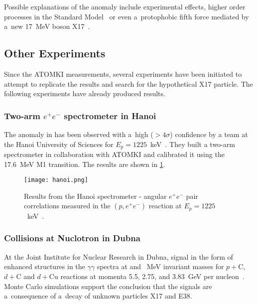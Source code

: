 				Possible explanations of the anomaly include experimental effects, higher order processes in the Standard Model~\cite{kalman,aleksejevs} or even a~protophobic fifth force mediated by a~new 17~MeV boson X17~\cite{feng}.
		\subsection{Other Experiments}
			Since the ATOMKI measurements, several experiments have been initiated to attempt to replicate the results and search for the hypothetical X17 particle. The following experiments have already produced results.
			
			\subsubsection{Two-arm $e^+e^-$ spectrometer in Hanoi}
				The anomaly in  has been observed with a~high ($>4\sigma$) confidence by a team at the Hanoi University of Sciences for $E_p = 1225$~keV~\cite{hanoi}. They built a two\nobreakdash-arm spectrometer in collaboration with ATOMKI and calibrated it using the 17.6~MeV M1 transition. The results are shown in \cref{fig:hanoi}.
				
				\begin{figure}
					\centering
					\texttt{[image: hanoi.png]}
					\caption{Results from the Hanoi spectrometer - angular $e^+e^-$ pair correlations measured in the $(p,e^+e^-)$ reaction at $E_p = 1225$~keV~\cite{hanoi}.}
					\label{fig:hanoi}
				\end{figure}
			
			\subsubsection{Collisions at Nuclotron in Dubna}
				At the Joint Institute for Nuclear Research in Dubna, signal in the form of enhanced structures in the $\gamma\gamma$ spectra at  and ~MeV invariant masses for $p+\mathrm{C}$, $d+\mathrm{C}$ and $d+\mathrm{Cu}$ reactions at momenta 5.5, 2.75, and 3.83~GeV per nucleon~\cite{dubna}. Monte Carlo simulations support the conclusion that the signals are a~consequence of a~decay of unknown particles X17 and E38.
				
